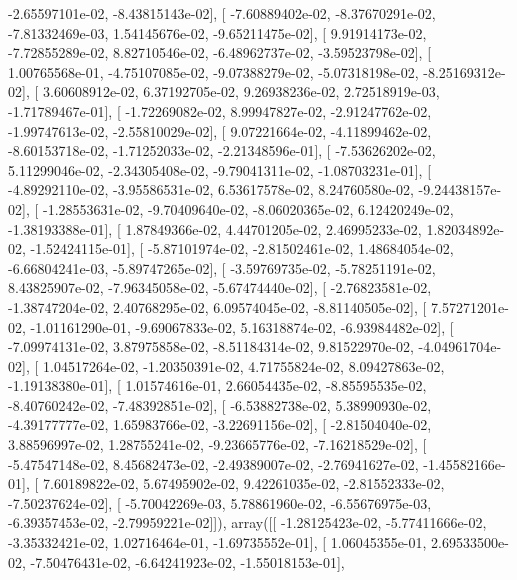 \documentclass{article}
\begin{document}
         -2.65597101e-02,  -8.43815143e-02],
       [ -7.60889402e-02,  -8.37670291e-02,  -7.81332469e-03,
          1.54145676e-02,  -9.65211475e-02],
       [  9.91914173e-02,  -7.72855289e-02,   8.82710546e-02,
         -6.48962737e-02,  -3.59523798e-02],
       [  1.00765568e-01,  -4.75107085e-02,  -9.07388279e-02,
         -5.07318198e-02,  -8.25169312e-02],
       [  3.60608912e-02,   6.37192705e-02,   9.26938236e-02,
          2.72518919e-03,  -1.71789467e-01],
       [ -1.72269082e-02,   8.99947827e-02,  -2.91247762e-02,
         -1.99747613e-02,  -2.55810029e-02],
       [  9.07221664e-02,  -4.11899462e-02,  -8.60153718e-02,
         -1.71252033e-02,  -2.21348596e-01],
       [ -7.53626202e-02,   5.11299046e-02,  -2.34305408e-02,
         -9.79041311e-02,  -1.08703231e-01],
       [ -4.89292110e-02,  -3.95586531e-02,   6.53617578e-02,
          8.24760580e-02,  -9.24438157e-02],
       [ -1.28553631e-02,  -9.70409640e-02,  -8.06020365e-02,
          6.12420249e-02,  -1.38193388e-01],
       [  1.87849366e-02,   4.44701205e-02,   2.46995233e-02,
          1.82034892e-02,  -1.52424115e-01],
       [ -5.87101974e-02,  -2.81502461e-02,   1.48684054e-02,
         -6.66804241e-03,  -5.89747265e-02],
       [ -3.59769735e-02,  -5.78251191e-02,   8.43825907e-02,
         -7.96345058e-02,  -5.67474440e-02],
       [ -2.76823581e-02,  -1.38747204e-02,   2.40768295e-02,
          6.09574045e-02,  -8.81140505e-02],
       [  7.57271201e-02,  -1.01161290e-01,  -9.69067833e-02,
          5.16318874e-02,  -6.93984482e-02],
       [ -7.09974131e-02,   3.87975858e-02,  -8.51184314e-02,
          9.81522970e-02,  -4.04961704e-02],
       [  1.04517264e-02,  -1.20350391e-02,   4.71755824e-02,
          8.09427863e-02,  -1.19138380e-01],
       [  1.01574616e-01,   2.66054435e-02,  -8.85595535e-02,
         -8.40760242e-02,  -7.48392851e-02],
       [ -6.53882738e-02,   5.38990930e-02,  -4.39177777e-02,
          1.65983766e-02,  -3.22691156e-02],
       [ -2.81504040e-02,   3.88596997e-02,   1.28755241e-02,
         -9.23665776e-02,  -7.16218529e-02],
       [ -5.47547148e-02,   8.45682473e-02,  -2.49389007e-02,
         -2.76941627e-02,  -1.45582166e-01],
       [  7.60189822e-02,   5.67495902e-02,   9.42261035e-02,
         -2.81552333e-02,  -7.50237624e-02],
       [ -5.70042269e-03,   5.78861960e-02,  -6.55676975e-03,
         -6.39357453e-02,  -2.79959221e-02]]), array([[ -1.28125423e-02,  -5.77411666e-02,  -3.35332421e-02,
          1.02716464e-01,  -1.69735552e-01],
       [  1.06045355e-01,   2.69533500e-02,  -7.50476431e-02,
         -6.64241923e-02,  -1.55018153e-01],
\end{document}
